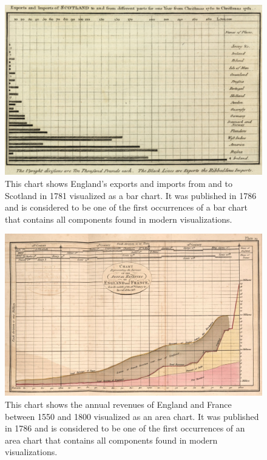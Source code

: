 \begin{figure}[tp]
    \centering
    \includegraphics[keepaspectratio,width=\linewidth,height=\fullh / 3]
    {images/playfair-bar-chart.png}
    \caption[Bar Chart by William Playfair from 1786]{
        This chart shows England's exports and imports from and to Scotland in 1781 visualized as a bar chart. It was published in 1786 and is considered to be one of the first occurrences of a bar chart that contains all components found in modern visualizations. 
    }
    \label{fig:PlayfairBarChart}
\end{figure}

\begin{figure}[tp]
    \centering
    \includegraphics[keepaspectratio,width=\linewidth,height=\fullh / 3]
    {images/playfair-area-chart.png}
    \caption[Area Chart by William Playfair from 1786]{
        This chart shows the annual revenues of England and France between 1550 and 1800 visualized as an area chart. It was published in 1786 and is considered to be one of the first occurrences of an area chart that contains all components found in modern visualizations. 
    }
    \label{fig:PlayfairAreaChart}
\end{figure}

